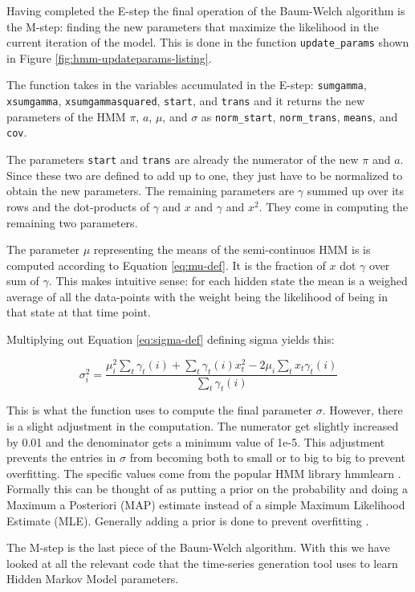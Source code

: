 Having completed the E-step the final operation of the Baum-Welch algorithm is the M-step: finding the new parameters that maximize the likelihood in the current iteration of the model. This is done in the function \texttt{update\_params} shown in Figure \ref{fig:hmm-updateparams-listing}.

The function takes in the variables accumulated in the E-step: \texttt{sumgamma}, \texttt{xsumgamma}, \texttt{xsumgammasquared}, \texttt{start}, and \texttt{trans} and it returns the new parameters of the HMM $\pi$, $a$, $\mu$, and $\sigma$ as \texttt{norm\_start}, \texttt{norm\_trans}, \texttt{means}, and \texttt{cov}. 

The parameters \texttt{start} and \texttt{trans} are already the numerator of the new $\pi$ and $a$. Since these two are defined to add up to one, they just have to be normalized to obtain the new parameters. The remaining parameters are $\gamma$ summed up over its rows and the dot-products of $\gamma$ and $x$ and $\gamma$ and $x^2$. They come in computing the remaining two parameters. 

The parameter $\mu$ representing the means of the semi-continuos HMM is is computed according to Equation \eqref{eq:mu-def}. It is the fraction of $x$ dot $\gamma$ over sum of $\gamma$. This makes intuitive sense: for each hidden state the mean is a weighed average of all the data-points with the weight being the likelihood of being in that state at that time point. 

Multiplying out Equation \eqref{eq:sigma-def} defining sigma yields this: 

\begin{equation}
   \sigma_i^2 = \frac{\mu_i^2 \sum_t \gamma_t(i) + \sum_t \gamma_t(i)x_t^2 - 2 \mu_i \sum_t x_t \gamma_t(i)}{\sum_t \gamma_t(i)}
\end{equation}

This is what the function uses to compute the final parameter $\sigma$. However, there is a slight adjustment in the computation. The numerator get slightly increased by 0.01 and the denominator gets a minimum value of 1e-5. This adjustment prevents the entries in $\sigma$ from becoming both to small or to big to big to prevent overfitting. The specific values come from the popular HMM library hmmlearn \parencite{weiss2019hmmlearn}. Formally this can be thought of as putting a prior on the probability and doing a Maximum a Posteriori (MAP) estimate instead of a simple Maximum Likelihood Estimate (MLE). Generally adding a prior is done to prevent overfitting \parencite{gauvain1994maximum}.

The M-step is the last piece of the Baum-Welch algorithm. With this we have looked at all the relevant code that the time-series generation tool uses to learn Hidden Markov Model parameters. 